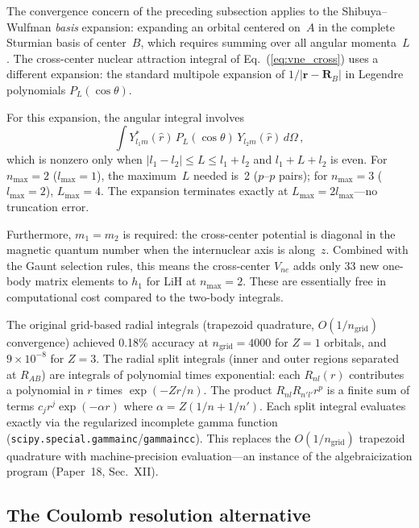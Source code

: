 \documentclass[aps,pra,twocolumn,superscriptaddress,longbibliography]{revtex4-2}
\begin{document}
The convergence concern of the preceding subsection applies to the
Shibuya--Wulfman \emph{basis} expansion: expanding an orbital
centered on~$A$ in the complete Sturmian basis of center~$B$, which
requires summing over all angular momenta~$L$.  The cross-center
nuclear attraction integral of Eq.~(\ref{eq:vne_cross}) uses a
different expansion: the standard multipole expansion of
$1/|\mathbf{r}-\mathbf{R}_B|$ in Legendre polynomials $P_L(\cos\theta)$.

For this expansion, the angular integral involves
\begin{equation}
\int Y_{l_1 m}^*(\hat{r})\, P_L(\cos\theta)\, Y_{l_2 m}(\hat{r})\, d\Omega\,,
\end{equation}
which is nonzero only when $|l_1 - l_2| \le L \le l_1 + l_2$ and
$l_1 + L + l_2$ is even.  For $n_{\max} = 2$ ($l_{\max} = 1$), the
maximum~$L$ needed is~2 ($p$--$p$ pairs); for $n_{\max} = 3$
($l_{\max} = 2$), $L_{\max} = 4$.  The expansion terminates exactly
at $L_{\max} = 2 l_{\max}$---no truncation error.

Furthermore, $m_1 = m_2$ is required: the cross-center potential is
diagonal in the magnetic quantum number when the internuclear axis is
along~$z$.  Combined with the Gaunt selection rules, this means the
cross-center $V_{ne}$ adds only 33 new one-body matrix elements to
$h_1$ for LiH at $n_{\max} = 2$.  These are essentially free in
computational cost compared to the two-body integrals.

The original grid-based radial integrals (trapezoid quadrature,
$O(1/n_{\mathrm{grid}})$ convergence) achieved 0.18\% accuracy at
$n_{\mathrm{grid}} = 4000$ for $Z = 1$ orbitals, and $9 \times 10^{-8}$
for $Z = 3$.  The radial split integrals (inner and outer regions
separated at $R_{AB}$) are integrals of polynomial times exponential:
each $R_{nl}(r)$ contributes a polynomial in $r$ times
$\exp(-Zr/n)$.  The product $R_{nl} R_{n'l'} r^p$ is a finite sum of
terms $c_j r^j \exp(-\alpha r)$ where $\alpha = Z(1/n + 1/n')$.
Each split integral evaluates exactly via the regularized incomplete
gamma function (\texttt{scipy.special.gammainc}/\texttt{gammaincc}).
This replaces the $O(1/n_{\mathrm{grid}})$ trapezoid quadrature with
machine-precision evaluation---an instance of the algebraicization
program (Paper~18, Sec.~XII).

\subsection{The Coulomb resolution alternative}
\end{document}

